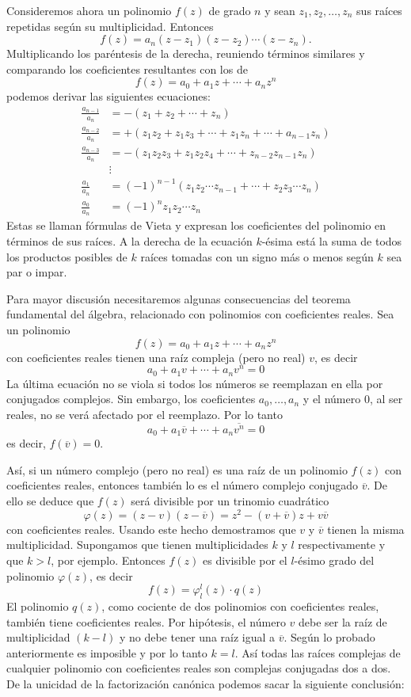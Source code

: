 Consideremos ahora un polinomio $f(z)$ de grado $n$ y sean $z_1,  z_2,  \dots,  z_n$ sus raíces repetidas según su multiplicidad. Entonces
$$f(z)=a_n (z-z_1)(z-z_2) \cdots (z-z_n).$$
Multiplicando los paréntesis de la derecha, reuniendo términos similares y comparando los coeficientes resultantes con los de
$$f(z)=a_0+a_1z+ \cdots + a_nz^n$$
podemos derivar las siguientes ecuaciones:
\begin{align*}
    \frac{a_{n-1}}{a_n} &= - (z_1 + z_2 + \cdots + z_n) \\ 
    \frac{a_{n-2}}{a_n} &= + (z_1z_2 + z_1z_3 + \cdots +z_1z_n + \cdots + a_{n-1}z_n) \\ 
    \frac{a_{n-3}}{a_n} &= - (z_1z_2z_3 + z_1z_2z_4 + \cdots + z_{n-2}z_{n-1}z_n) \\ 
    & \vdots \\ 
    \frac{a_1}{a_n} &= (-1)^{n-1} (z_1z_2 \cdots z_{n-1} + \cdots + z_2z_3 \cdots z_n) \\ 
    \frac{a_0}{a_n} &= (-1)^n z_1z_2 \cdots z_n
\end{align*}
Estas se llaman fórmulas de Vieta y expresan los coeficientes del polinomio en términos de sus raíces. A la derecha de la ecuación $k$-ésima está la suma de todos los productos posibles de $k$ raíces tomadas con un signo más o menos según $k$ sea par o impar.

Para mayor discusión necesitaremos algunas consecuencias del teorema fundamental del álgebra, relacionado con polinomios con coeficientes reales. Sea un polinomio
$$f(z)=a_0+a_1z+ \cdots + a_nz^n$$
con coeficientes reales tienen una raíz compleja (pero no real) $v$, es decir
$$a_0+a_1v+ \cdots + a_nv^n=0$$
La última ecuación no se viola si todos los números se reemplazan en ella por conjugados complejos. Sin embargo, los coeficientes $a_0,  \dots,  a_n$ y el número $0$, al ser reales, no se verá afectado por el reemplazo. Por lo tanto
$$a_0+a_1\overline{v}+ \cdots + a_n\overline{v^n}=0$$
es decir, $f(\overline{v})=0$.

Así, si un número complejo (pero no real) es una raíz de un polinomio $f(z)$ con coeficientes reales, entonces también lo es el número complejo conjugado $\overline{v}$. De ello se deduce que $f(z)$ será divisible por un trinomio cuadrático
$$\varphi (z)=(z-v)(z-\overline{v}) = z^2 - (v+\overline{v})z+v \overline{v}$$\newpage\noindent
con coeficientes reales. Usando este hecho demostramos que $v$ y $\overline{v}$ tienen la misma multiplicidad. Supongamos que tienen multiplicidades $k$ y $l$ respectivamente y que $k > l$, por ejemplo. Entonces $f(z)$ es divisible por el $l$-ésimo grado del polinomio $\varphi (z)$, es decir
$$f(z)=\varphi _l^l (z) \cdot q(z)$$
El polinomio $q(z)$, como cociente de dos polinomios con coeficientes reales, también tiene coeficientes reales. Por hipótesis, el número $v$ debe ser la raíz de multiplicidad $(k - l)$ y no debe tener una raíz igual a $\overline{v}$. Según lo probado anteriormente es imposible y por lo tanto $k = l$. Así todas las raíces complejas de cualquier polinomio con coeficientes reales son complejas conjugadas dos a dos. De la unicidad de la factorización canónica podemos sacar la siguiente conclusión:

